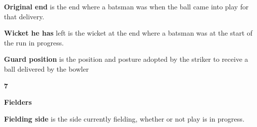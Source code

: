 \documentclass[12pt]{article}
\begin{document}
\vspace{\baselineskip}

\vspace{\baselineskip}

\vspace{\baselineskip}
\begin{Center}
{\fontsize{8pt}{9.6pt}\par}
\end{Center}\par


\vspace{\baselineskip}
{\fontsize{9pt}{10.8pt} \tabto{0.39in} {\fontsize{8pt}{9.6pt}\selectfont \textbf{Original end }is the end where a batsman was when the ball came into play for that delivery.\par}\par}\par


\vspace{\baselineskip}
{\fontsize{9pt}{10.8pt} \tabto{0.39in} {\fontsize{8pt}{9.6pt}\selectfont \textbf{Wicket he has }left is the wicket at the end where a batsman was at the start of the run in progress.\par}\par}\par


\vspace{\baselineskip}
{\fontsize{9pt}{10.8pt} \tabto{0.39in} {\fontsize{8pt}{9.6pt}\selectfont \textbf{Guard position }is the position and posture adopted by the striker to receive a ball delivered by the bowler\par}\par}\par


\vspace{\baselineskip}
{\fontsize{16pt}{19.2pt}\selectfont \textbf{7 \tabto{0.29in} }{\fontsize{15pt}{18.0pt}\selectfont \textbf{Fielders}\par}\par}\par


\vspace{\baselineskip}
{\fontsize{9pt}{10.8pt} \tabto{0.39in} {\fontsize{8pt}{9.6pt}\selectfont \textbf{Fielding side }is the side currently fielding, whether or not play is in progress.\par}\par}\par
\end{document}

